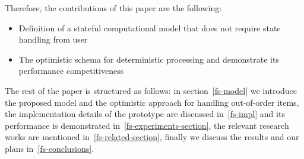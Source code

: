 Therefore, the contributions of this paper are the following:

\begin {itemize}
\item Definition of a stateful computational model that does not require state handling from user
\item The optimistic schema for deterministic processing and demonstrate its performance competitiveness
\end {itemize}

The rest of the paper is structured as follows: in section~\ref{fs-model} we introduce the proposed model and the optimistic approach for handling out-of-order items, the implementation details of the prototype are discussed in~\ref{fs-impl} and its performance is demonstrated in~\ref{fs-experiments-section}, the relevant research works are mentioned in~\ref{fs-related-section}, finally we discuss the results and our plans in~\ref{fs-conclusions}.

\endinput
